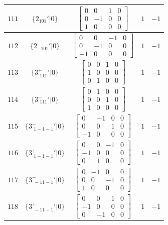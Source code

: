 \documentclass[fleqn,8pt]{jsarticle}
\begin{document}
\begin{longtable}{ccccc}
$ 111 $ & $ \{2{}_{101}{}'|0\} $ & $ \begin{bmatrix} 0 & 0 & 1 & 0 \\ 0 & -1 & 0 & 0 \\ 1 & 0 & 0 & 0 \end{bmatrix} $ & $ 1 $ & $ -1 $ \\ \hline
$ 112 $ & $ \{2{}_{-101}{}'|0\} $ & $ \begin{bmatrix} 0 & 0 & -1 & 0 \\ 0 & -1 & 0 & 0 \\ -1 & 0 & 0 & 0 \end{bmatrix} $ & $ 1 $ & $ -1 $ \\ \hline
$ 113 $ & $ \{3^{+}_{\,\,111}{}'|0\} $ & $ \begin{bmatrix} 0 & 0 & 1 & 0 \\ 1 & 0 & 0 & 0 \\ 0 & 1 & 0 & 0 \end{bmatrix} $ & $ 1 $ & $ -1 $ \\ \hline
$ 114 $ & $ \{3^{-}_{\,\,111}{}'|0\} $ & $ \begin{bmatrix} 0 & 1 & 0 & 0 \\ 0 & 0 & 1 & 0 \\ 1 & 0 & 0 & 0 \end{bmatrix} $ & $ 1 $ & $ -1 $ \\ \hline
$ 115 $ & $ \{3^{-}_{\,\,1-1-1}{}'|0\} $ & $ \begin{bmatrix} 0 & -1 & 0 & 0 \\ 0 & 0 & 1 & 0 \\ -1 & 0 & 0 & 0 \end{bmatrix} $ & $ 1 $ & $ -1 $ \\ \hline
$ 116 $ & $ \{3^{+}_{\,\,1-1-1}{}'|0\} $ & $ \begin{bmatrix} 0 & 0 & -1 & 0 \\ -1 & 0 & 0 & 0 \\ 0 & 1 & 0 & 0 \end{bmatrix} $ & $ 1 $ & $ -1 $ \\ \hline
$ 117 $ & $ \{3^{-}_{\,\,-11-1}{}'|0\} $ & $ \begin{bmatrix} 0 & -1 & 0 & 0 \\ 0 & 0 & -1 & 0 \\ 1 & 0 & 0 & 0 \end{bmatrix} $ & $ 1 $ & $ -1 $ \\ \hline
$ 118 $ & $ \{3^{+}_{\,\,-11-1}{}'|0\} $ & $ \begin{bmatrix} 0 & 0 & 1 & 0 \\ -1 & 0 & 0 & 0 \\ 0 & -1 & 0 & 0 \end{bmatrix} $ & $ 1 $ & $ -1 $ \\ \hline

\end{longtable}
\end{document}
